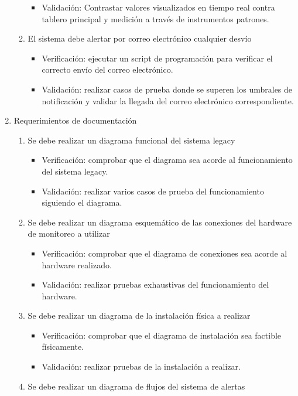 \documentclass[
11pt, %
]{charter}
\begin{document}
\begin{enumerate}
\begin{enumerate}
\begin{itemize}
				\item Validación: Contrastar valores visualizados en tiempo real contra tablero principal y medición a través de instrumentos patrones.
			\end{itemize}
			\item El sistema debe alertar por correo electrónico cualquier desvío
			\begin{itemize}
				\item Verificación: ejecutar un script de programación para verificar el correcto envío del correo electrónico.
				\item Validación: realizar casos de prueba donde se superen los umbrales de notificación y validar la llegada del correo electrónico correspondiente.
			\end{itemize}
		\end{enumerate}
	\item Requerimientos de documentación
		\begin{enumerate}		
			\item Se debe realizar un diagrama funcional del sistema legacy
			\begin{itemize}
				\item Verificación: comprobar que el diagrama sea acorde al funcionamiento del sistema legacy.
				\item Validación: realizar varios casos de prueba del funcionamiento siguiendo el diagrama.
			\end{itemize}
			\item Se debe realizar un diagrama esquemático de las conexiones del hardware de monitoreo a utilizar
			\begin{itemize}
				\item Verificación: comprobar que el diagrama de conexiones sea acorde al hardware realizado.
				\item Validación: realizar pruebas exhaustivas del funcionamiento del hardware.
			\end{itemize}
			\item Se debe realizar un diagrama de la instalación física a realizar
			\begin{itemize}
				\item Verificación: comprobar que el diagrama de instalación sea factible físicamente.
				\item Validación: realizar pruebas de la instalación a realizar.
			\end{itemize}
			\item Se debe realizar un diagrama de flujos del sistema de alertas

\end{enumerate}
\end{enumerate}
\end{document}
